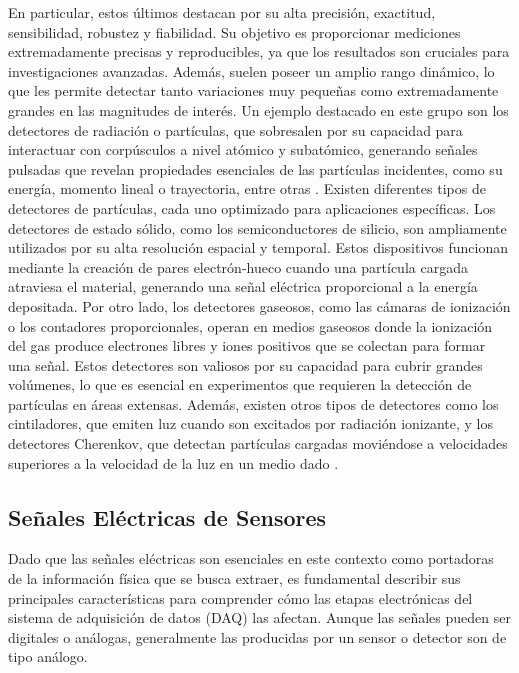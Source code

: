 \documentclass[]{book}
\begin{document}
\noindent En particular, estos últimos destacan por su alta precisión, exactitud, sensibilidad, robustez y fiabilidad. Su objetivo es proporcionar mediciones extremadamente precisas y reproducibles, ya que los resultados son cruciales para investigaciones avanzadas. Además, suelen poseer un amplio rango dinámico, lo que les permite detectar tanto variaciones muy pequeñas como extremadamente grandes en las magnitudes de interés. Un ejemplo destacado en este grupo son los detectores de radiación o partículas, que sobresalen por su capacidad para interactuar con corpúsculos a nivel atómico y subatómico, generando señales pulsadas que revelan propiedades esenciales de las partículas incidentes, como su energía, momento lineal o trayectoria, entre otras \cite{knoll2010radiation}. Existen diferentes tipos de detectores de partículas, cada uno optimizado para aplicaciones específicas. Los detectores de estado sólido, como los semiconductores de silicio, son ampliamente utilizados por su alta resolución espacial y temporal. Estos dispositivos funcionan mediante la creación de pares electrón-hueco cuando una partícula cargada atraviesa el material, generando una señal eléctrica proporcional a la energía depositada. Por otro lado, los detectores gaseosos, como las cámaras de ionización o los contadores proporcionales, operan en medios gaseosos donde la ionización del gas produce electrones libres y iones positivos que se colectan para formar una señal. Estos detectores son valiosos por su capacidad para cubrir grandes volúmenes, lo que es esencial en experimentos que requieren la detección de partículas en áreas extensas. Además, existen otros tipos de detectores como los cintiladores, que emiten luz cuando son excitados por radiación ionizante, y los detectores Cherenkov, que detectan partículas cargadas moviéndose a velocidades superiores a la velocidad de la luz en un medio dado \cite{kolanoski2020particle}.



\subsection{Señales Eléctricas de Sensores}

\noindent Dado que las señales eléctricas son esenciales en este contexto como portadoras de la información física que se busca extraer, es fundamental describir sus principales características para comprender cómo las etapas electrónicas del sistema de adquisición de datos (DAQ) las afectan. Aunque las señales pueden ser digitales o análogas, generalmente las producidas por un sensor o detector son de tipo análogo. \\
\end{document}
